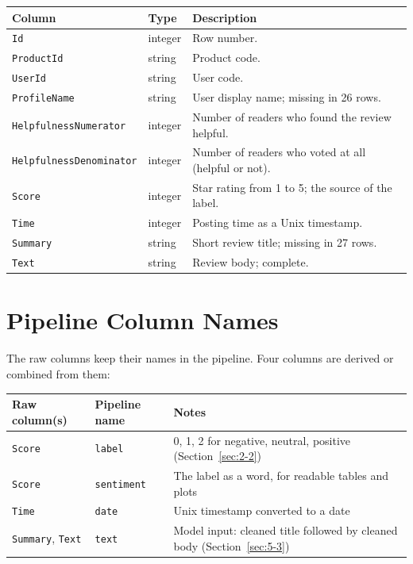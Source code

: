 \begin{center}
\begin{tabular}{@{}p{4.6cm}p{2cm}p{8cm}@{}}
    \toprule
    Column & Type & Description \\
    \midrule
    \texttt{Id} & integer & Row number. \\
    \texttt{ProductId} & string & Product code. \\
    \texttt{UserId} & string & User code. \\
    \texttt{ProfileName} & string & User display name; missing in 26 rows. \\
    \texttt{HelpfulnessNumerator} & integer & Number of readers who found the review helpful. \\
    \texttt{HelpfulnessDenominator} & integer & Number of readers who voted at all (helpful or not). \\
    \texttt{Score} & integer & Star rating from 1 to 5; the source of the label. \\
    \texttt{Time} & integer & Posting time as a Unix timestamp. \\
    \texttt{Summary} & string & Short review title; missing in 27 rows. \\
    \texttt{Text} & string & Review body; complete. \\
    \bottomrule
\end{tabular}
\end{center}

\section{Pipeline Column Names}
\label{sec:3-4}

The raw columns keep their names in the pipeline. Four columns are derived or combined from them:

\begin{center}
\begin{tabular}{@{}p{3.6cm}p{2.6cm}p{8.2cm}@{}}
    \toprule
    Raw column(s) & Pipeline name & Notes \\
    \midrule
    \texttt{Score} & \texttt{label} & 0, 1, 2 for negative, neutral, positive (Section~\ref{sec:2-2}) \\
    \texttt{Score} & \texttt{sentiment} & The label as a word, for readable tables and plots \\
    \texttt{Time} & \texttt{date} & Unix timestamp converted to a date \\
    \texttt{Summary}, \texttt{Text} & \texttt{text} & Model input: cleaned title followed by cleaned body (Section~\ref{sec:5-3}) \\
    \bottomrule
\end{tabular}
\end{center}

